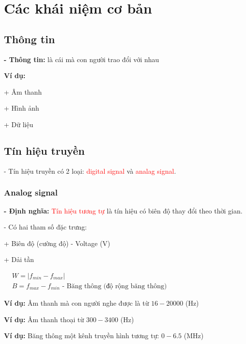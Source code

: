\chapter{Các khái niệm cơ bản}

\section{Thông tin}

\textbf{- Thông tin:} là cái mà con người trao đổi với nhau

\noindent\textbf{Ví dụ:}

+ Âm thanh

+ Hình ảnh

+ Dữ liệu

\section{Tín hiệu truyền}
- Tín hiệu truyền có 2 loại: \textcolor{red}{digital signal} và \textcolor{red}{analag signal}.

\subsection{Analog signal}
\textbf{- Định nghĩa: }\textcolor{red}{Tín hiệu tương tự} là tín hiệu có biên độ thay đổi theo thời gian.
\begin{center}
    
\end{center}

\newpage
- Có hai tham số đặc trưng: 

\hspace*{1cm}+ Biên độ (cường độ) - Voltage (V)

\hspace*{1cm}+ Dải tần

\hspace*{2cm}
$
\begin{aligned}
    &\boxed{W = |f_{min} - f_{max}|}\\[6pt]
    &\boxed{B = f_{max} - f_{min}} \text{ - Băng thông (độ rộng băng thông)}
\end{aligned}
$

\noindent\textbf{Ví dụ: } Âm thanh mà con người nghe được là từ $16 - 20000$ (Hz)

\noindent\textbf{Ví dụ: } Âm thanh thoại từ $300 - 3400$ (Hz)

\noindent\textbf{Ví dụ: } Băng thông một kênh truyền hình tương tự: $0 - 6.5$ (MHz)

